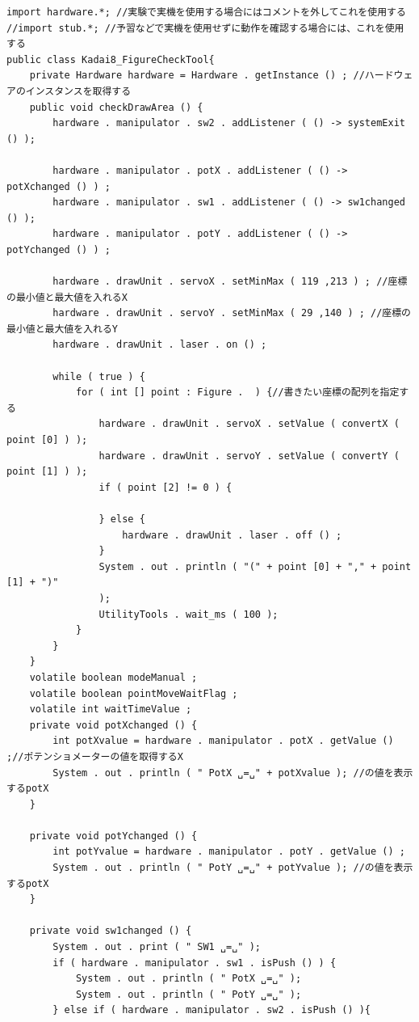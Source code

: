 \documentclass{jarticle}
\begin{document}
\newpage

\begin{lstlisting}[caption=FigureCheckTool]
  import hardware.*; //実験で実機を使用する場合にはコメントを外してこれを使用する
//import stub.*; //予習などで実機を使用せずに動作を確認する場合には、これを使用する
public class Kadai8_FigureCheckTool{   
    private Hardware hardware = Hardware . getInstance () ; //ハードウェアのインスタンスを取得する
    public void checkDrawArea () {
        hardware . manipulator . sw2 . addListener ( () -> systemExit () );

        hardware . manipulator . potX . addListener ( () -> potXchanged () ) ;
        hardware . manipulator . sw1 . addListener ( () -> sw1changed () );
        hardware . manipulator . potY . addListener ( () -> potYchanged () ) ;

        hardware . drawUnit . servoX . setMinMax ( 119 ,213 ) ; //座標の最小値と最大値を入れるX
        hardware . drawUnit . servoY . setMinMax ( 29 ,140 ) ; //座標の最小値と最大値を入れるY
        hardware . drawUnit . laser . on () ;

        while ( true ) {
            for ( int [] point : Figure .  ) {//書きたい座標の配列を指定する
                hardware . drawUnit . servoX . setValue ( convertX ( point [0] ) );
                hardware . drawUnit . servoY . setValue ( convertY ( point [1] ) );
                if ( point [2] != 0 ) {

                } else {
                    hardware . drawUnit . laser . off () ;
                }
                System . out . println ( "(" + point [0] + "," + point [1] + ")"
                );
                UtilityTools . wait_ms ( 100 );
            }
        }
    }
    volatile boolean modeManual ;
    volatile boolean pointMoveWaitFlag ;
    volatile int waitTimeValue ;
    private void potXchanged () {
        int potXvalue = hardware . manipulator . potX . getValue () ;//ポテンショメーターの値を取得するX
        System . out . println ( " PotX ␣=␣" + potXvalue ); //の値を表示するpotX
    }

    private void potYchanged () {
        int potYvalue = hardware . manipulator . potY . getValue () ;
        System . out . println ( " PotY ␣=␣" + potYvalue ); //の値を表示するpotX
    }

    private void sw1changed () {
        System . out . print ( " SW1 ␣=␣" );
        if ( hardware . manipulator . sw1 . isPush () ) { 
            System . out . println ( " PotX ␣=␣" );
            System . out . println ( " PotY ␣=␣" );
        } else if ( hardware . manipulator . sw2 . isPush () ){


\end{lstlisting}
\end{document}
